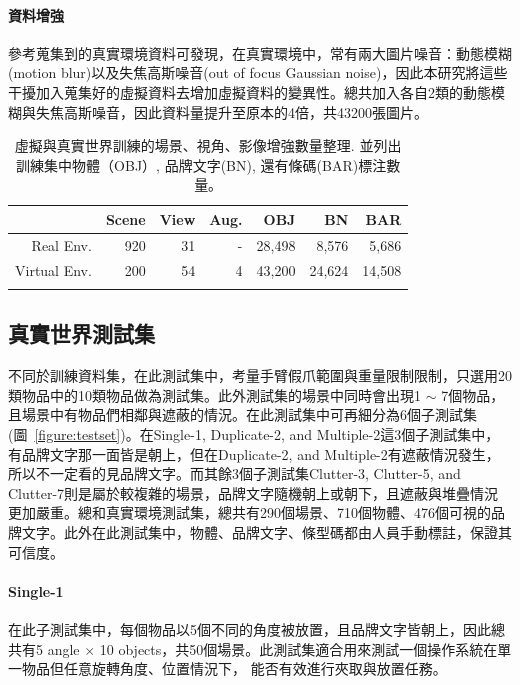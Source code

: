 \paragraph{資料增強}
參考蒐集到的真實環境資料可發現，在真實環境中，常有兩大圖片噪音：動態模糊(motion blur)以及失焦高斯噪音(out of focus Gaussian noise)，因此本研究將這些干擾加入蒐集好的虛擬資料去增加虛擬資料的變異性。總共加入各自2類的動態模糊與失焦高斯噪音，因此資料量提升至原本的4倍，共43200張圖片。

\begin{table}[ht]
\caption{虛擬與真實世界訓練的場景、視角、影像增強數量整理. 並列出訓練集中物體（OBJ）, 品牌文字(BN), 還有條碼(BAR)標注數量。}
\centering
\begin{tabular}{rrrr|rrr}
\hline
         & Scene & View & Aug. & OBJ       & BN       & BAR \\ \hline
Real Env. 	& 920   & 31   & -        & 28,498       & 8,576    & 5,686     \\
Virtual Env.   	& 200   & 54   & 4      & 43,200       & 24,624         & 14,508          \\
\hline
\label{table:training_set_table}
\end{tabular}
\end{table}

\subsection{真實世界測試集}
不同於訓練資料集，在此測試集中，考量手臂假爪範圍與重量限制限制，只選用20類物品中的10類物品做為測試集。此外測試集的場景中同時會出現1 $\sim$ 7個物品，且場景中有物品們相鄰與遮蔽的情況。在此測試集中可再細分為6個子測試集(圖~\ref{figure:testset})。在Single-1, Duplicate-2, and Multiple-2這3個子測試集中，有品牌文字那一面皆是朝上，但在Duplicate-2, and Multiple-2有遮蔽情況發生，所以不一定看的見品牌文字。而其餘3個子測試集Clutter-3, Clutter-5, and Clutter-7則是屬於較複雜的場景，品牌文字隨機朝上或朝下，且遮蔽與堆疊情況更加嚴重。總和真實環境測試集，總共有290個場景、710個物體、476個可視的品牌文字。此外在此測試集中，物體、品牌文字、條型碼都由人員手動標註，保證其可信度。

\paragraph{Single-1}
在此子測試集中，每個物品以5個不同的角度被放置，且品牌文字皆朝上，因此總共有5 angle $\times$ 10 objects，共50個場景。此測試集適合用來測試一個操作系統在單一物品但任意旋轉角度、位置情況下， 能否有效進行夾取與放置任務。


